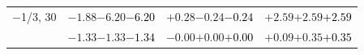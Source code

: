 \documentclass[compress]{beamer}
\begin{document}
\begin{frame}
\begin{tabular}{r | c | c | c}
$-$1/3, 30 & $-1.88$\hspace{0.1 cm}$-6.20$\hspace{0.1 cm}\textcolor{black}{$-6.20$} & $+0.28$\hspace{0.1 cm}$-0.24$\hspace{0.1 cm}\textcolor{black}{$-0.24$} & $+2.59$\hspace{0.1 cm}$+2.59$\hspace{0.1 cm}\textcolor{black}{$+2.59$} \\
           & $-1.33$\hspace{0.1 cm}$-1.33$\hspace{0.1 cm}\textcolor{black}{$-1.34$} & $-0.00$\hspace{0.1 cm}$+0.00$\hspace{0.1 cm}\textcolor{black}{$+0.00$} & $+0.09$\hspace{0.1 cm}$+0.35$\hspace{0.1 cm}\textcolor{black}{$+0.35$} \\
\end{tabular}
\end{frame}
\end{document}
